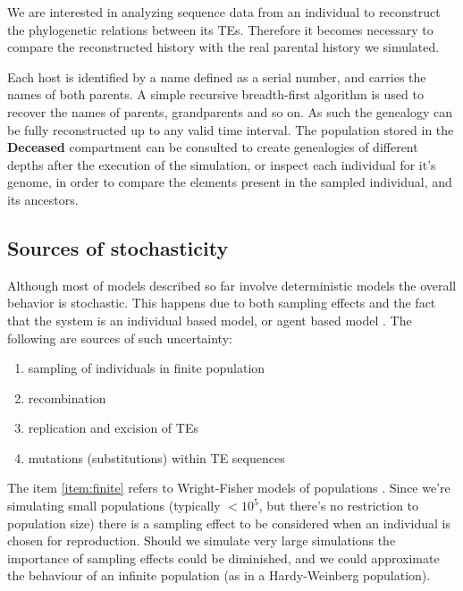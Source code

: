 \documentclass[10pt]{article}
\begin{document}
We are interested in analyzing sequence data from an individual to
reconstruct the phylogenetic relations between its TEs. Therefore it
becomes necessary to compare the reconstructed history with the real
parental history we simulated.

Each host is identified by a name defined as a serial number, and
carries the names of both parents. A simple recursive breadth-first
algorithm is used to recover the names of parents, grandparents and so
on. As such the genealogy can be fully reconstructed up to any valid
time interval. The population stored in the {\bf Deceased}
compartment can be consulted to create genealogies of different depths
after the execution of the simulation, or inspect each individual for
it's genome, in order to compare the elements present in the sampled
individual, and its ancestors.

\subsection{Sources of stochasticity}
Although most of models described so far involve deterministic models
the overall behavior is stochastic. This happens due to both sampling
effects and the fact that the system is an individual based model, or
agent based model \cite{Bon02}. The following are sources of such
uncertainty:

\begin{enumerate}

\item sampling of individuals in finite population
\label{item:finite}

\item recombination
\label{item:recombination}

\item replication and excision of TEs
\label{item:transposition}

\item mutations (substitutions) within TE sequences
\label{item:mutation}

\end{enumerate}

The item \ref{item:finite} refers to Wright-Fisher models of
populations \cite{HC98}. Since we're simulating small populations
(typically $<10^5$, but there's no restriction to population size)
there is a sampling effect to be considered when an individual is
chosen for reproduction. Should we simulate very large simulations the
importance of sampling effects could be diminished, and we could
approximate the behaviour of an infinite population (as in a
Hardy-Weinberg population).
\end{document}
